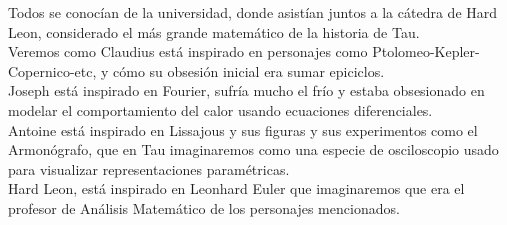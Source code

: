 \documentclass[preview]{standalone}
\begin{document}
\begin{center}
Todos se conocían de la universidad, donde asistían juntos a la cátedra de Hard Leon, considerado el más grande matemático de la historia de Tau.
$$ $$ 
Veremos como Claudius está inspirado en personajes como Ptolomeo-Kepler-Copernico-etc, y cómo su obsesión inicial era sumar epiciclos.  
$$ $$ 
Joseph está inspirado en Fourier, sufría mucho el frío y estaba obsesionado en modelar el comportamiento del calor usando ecuaciones diferenciales.  
$$ $$ 
Antoine está inspirado en Lissajous y sus figuras y sus experimentos como el Armonógrafo, que en Tau imaginaremos como una especie de osciloscopio usado para visualizar representaciones paramétricas.
$$ $$ 
Hard Leon, está inspirado en Leonhard Euler que imaginaremos que era el profesor de Análisis Matemático de los personajes mencionados.
\end{center}
\end{document}
